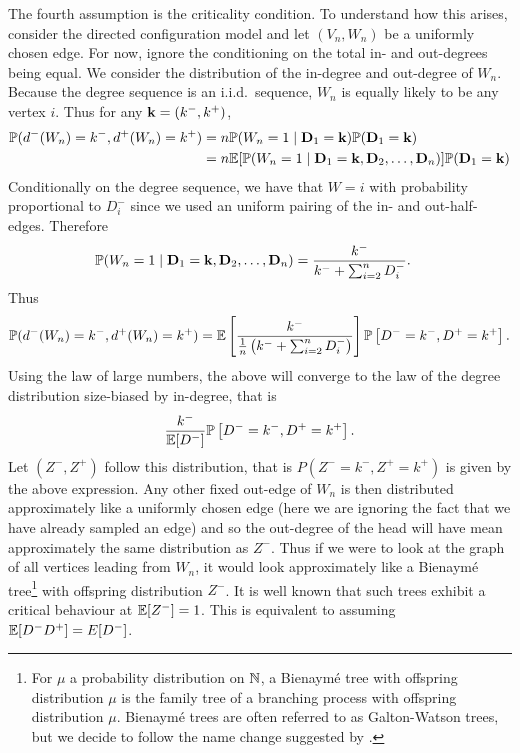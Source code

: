 The fourth assumption is the criticality condition. To understand how this arises, consider the directed configuration model and let $(V_n, W_n)$ be a uniformly chosen edge. For now, ignore the conditioning on the total in- and out-degrees being equal. We consider the distribution of the in-degree and out-degree of $W_n$. Because the degree sequence is an i.i.d.\ sequence, $W_n$ is equally likely to be any vertex $i$. Thus for any ${\mathbf k} = (k^-, k^+)$,
\begin{align*}
    {\mathbb P}(d^-(W_n) = k^-, d^+(W_n) = k^+)
    &= n {\mathbb P}(W_n = 1 \mid {\mathbf D}_1 = {\mathbf k}) {\mathbb P}({\mathbf D}_1 = {\mathbf k}) \\
    &= n {\mathbb E}[{\mathbb P}(W_n = 1 \mid {\mathbf D}_1 = {\mathbf k}, {\mathbf D}_2, \ldots, {\mathbf D}_n)] {\mathbb P}({\mathbf D}_1 = {\mathbf k})
\end{align*}
Conditionally on the degree sequence, we have that $W = i$ with probability proportional to $D^-_i$ since we used an uniform pairing of the in- and out-half-edges. Therefore
\begin{align*}
    {\mathbb P}(W_n = 1 \mid {\mathbf D}_1 = {\mathbf k}, {\mathbf D}_2, \ldots, {\mathbf D}_n)
    &= \frac{k^-}{k^- + \sum_{i=2}^n D_i^-}.
\end{align*}
Thus
\begin{equation*}
    {\mathbb P}(d^-(W_n) = k^-, d^+(W_n) = k^+) = {\mathbb E}\left[ 
        \frac{k^-}{\frac{1}{n}\left( k^- + \sum_{i=2}^n D_i^- \right)}
    \right]
    {\mathbb P} \left[ D^- = k^-, D^+ = k^+ \right].
\end{equation*}
Using the law of large numbers, the above will converge to the law of the degree distribution size-biased by in-degree, that is
\begin{equation*}
    \frac{k^-}{{\mathbb E}[D^-]} {\mathbb P}\left[ D^- = k^-, D^+ = k^+ \right].
\end{equation*}
Let $(Z^-, Z^+)$ follow this distribution, that is $P(Z^- = k^-, Z^+ = k^+)$ is given by the above expression. Any other fixed out-edge of $W_n$ is then distributed approximately like a uniformly chosen edge (here we are ignoring the fact that we have already sampled an edge) and so the out-degree of the head will have mean approximately the same distribution as $Z^-$. Thus if we were to look at the graph of all vertices leading from $W_n$, it would look approximately like a Bienaymé tree\footnote{For $\mu$ a probability distribution on ${\mathbb N}$, a Bienaymé tree with offspring distribution $\mu$ is the family tree of a branching process with offspring distribution $\mu$. Bienaymé trees are often referred to as Galton-Watson trees, but we decide to follow the name change suggested by \citet{addarioberry2021universal}.} with offspring distribution $Z^-$. It is well known that such trees exhibit a critical behaviour at ${\mathbb E}[Z^-] = 1$. This is equivalent to assuming ${\mathbb E}[D^-D^+] = E[D^-]$.

